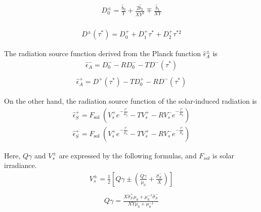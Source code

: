 \begin{equation}
\begin{array}{l}
D_{0}^{\pm}=\frac{\hat{b}_{0}}{Y}+\frac{2 \hat{b}_{2}}{X Y^{2}} \mp \frac{\hat{b}_{1}}{X Y} \\
\end{array}
\end{equation}

\begin{equation}
\begin{array}{l}
D^{\pm}\left(\tau^{*}\right)=D_{0}^{+}+D_{1}^{+} \tau^{*}+D_{2}^{+} \tau^{* 2}
\end{array}
\end{equation}

The radiation source function derived from the Planck function
\(\hat{\epsilon}_{A}^{\pm}\) is \begin{equation}
\begin{array}{l}
\hat{\epsilon}_{A}^{-}=D_{0}^{-}-R D_{0}^{-}-T D^{-}\left(\tau^{*}\right) \\
\end{array}
\end{equation} \begin{equation}
\begin{array}{l}
\hat{\epsilon}_{A}^{+}=D^{+}\left(\tau^{*}\right)-T D_{0}^{+}-R D^{-}\left(\tau^{*}\right)
\end{array}
\end{equation}

On the other hand, the radiation source function of the solar-induced
radiation is \begin{equation}
\begin{array}{l}
\hat{\epsilon}_{S}^{+}=F_{\text {sol }}\left(V_{s}^{+} e^{-\frac{\tau^{*}}{\mu_{0}}}-T V_{s}^{+}-R V_{s}^{-} e^{-\frac{\tau^{*}}{\mu_{0}}}\right)
\end{array}
\end{equation} \begin{equation}
\begin{array}{l}
\hat{\epsilon}_{S}^{+}=F_{\text {sol }}\left(V_{s}^{+} e^{-\frac{\tau^{*}}{\mu_{0}}}-T V_{s}^{+}-R V_{s}^{-} e^{-\frac{\tau^{*}}{\mu_{0}}}\right)
\end{array}
\end{equation}

Here, \(Q \gamma\) and \(V_{s}^{\pm}\) are expressed by the following
formulas, and \(F_{sol}\) is solar irradiance. \begin{equation}
\begin{array}{c}
V_{s}^{\pm}=\frac{1}{2}\left[Q \gamma \pm\left(\frac{Q \gamma}{\mu_{0}}+\frac{\hat{\sigma}_{S}^{-}}{X}\right)\right] \\
\end{array}
\end{equation} \begin{equation}
\begin{array}{c}
Q \gamma=\frac{X \hat{\sigma}_{S}^{+} \mu_{0}+\mu_{0}^{-1} \hat{\sigma}_{S}^{-}}{X Y \mu_{0}+\mu_{0}^{-1}}
\end{array}
\end{equation}

